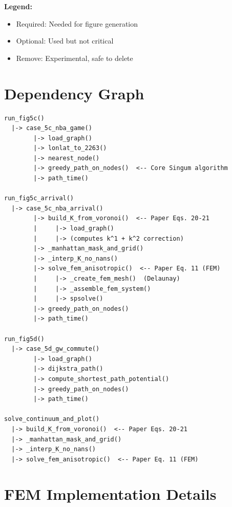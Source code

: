 \documentclass[11pt]{article}
\begin{document}
\textbf{Legend:}
\begin{itemize}[noitemsep]
    \item \textcolor{required}{Required}: Needed for figure generation
    \item \textcolor{optional}{Optional}: Used but not critical
    \item \textcolor{unused}{Remove}: Experimental, safe to delete
\end{itemize}

\section{Dependency Graph}

\begin{verbatim}
run_fig5c()
  |-> case_5c_nba_game()
        |-> load_graph()
        |-> lonlat_to_2263()
        |-> nearest_node()
        |-> greedy_path_on_nodes()  <-- Core Singum algorithm
        |-> path_time()

run_fig5c_arrival()
  |-> case_5c_nba_arrival()
        |-> build_K_from_voronoi()  <-- Paper Eqs. 20-21
        |     |-> load_graph()
        |     |-> (computes k^1 + k^2 correction)
        |-> _manhattan_mask_and_grid()
        |-> _interp_K_no_nans()
        |-> solve_fem_anisotropic()  <-- Paper Eq. 11 (FEM)
        |     |-> _create_fem_mesh()  (Delaunay)
        |     |-> _assemble_fem_system()
        |     |-> spsolve()
        |-> greedy_path_on_nodes()
        |-> path_time()

run_fig5d()
  |-> case_5d_gw_commute()
        |-> load_graph()
        |-> dijkstra_path()
        |-> compute_shortest_path_potential()
        |-> greedy_path_on_nodes()
        |-> path_time()

solve_continuum_and_plot()
  |-> build_K_from_voronoi()  <-- Paper Eqs. 20-21
  |-> _manhattan_mask_and_grid()
  |-> _interp_K_no_nans()
  |-> solve_fem_anisotropic()  <-- Paper Eq. 11 (FEM)
\end{verbatim}

\section{FEM Implementation Details}
\end{document}
